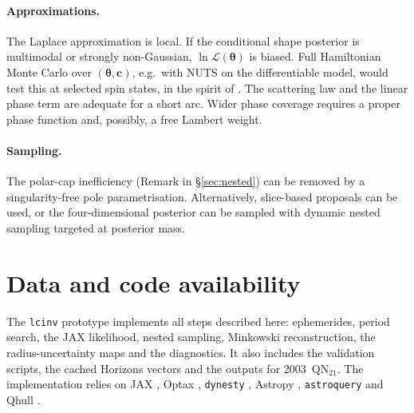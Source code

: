 \documentclass[11pt,a4paper]{article}
\theoremstyle{remark}
\newcommand{\vect}[1]{\bm{#1}}
\begin{document}
\paragraph{Approximations.} The Laplace approximation is local. If the conditional shape posterior is
multimodal or strongly non-Gaussian, $\ln\mathcal L(\vect\theta)$ is biased. Full Hamiltonian Monte
Carlo over $(\vect\theta,\vect c)$, e.g.\ with NUTS \citep{hoffman2014} on the differentiable model,
would test this at selected spin states, in the spirit of \citet{muinonen2020}. The scattering law and
the linear phase term are adequate for a short arc. Wider phase coverage requires a proper phase
function and, possibly, a free Lambert weight.

\paragraph{Sampling.} The polar-cap inefficiency (Remark in \S\ref{sec:nested}) can be removed by a
singularity-free pole parametrisation. Alternatively, slice-based proposals can be used, or the
four-dimensional posterior can be sampled with dynamic nested sampling targeted at posterior mass.

\section*{Data and code availability}
The \texttt{lcinv} prototype implements all steps described here: ephemerides, period search, the JAX
likelihood, nested sampling, Minkowski reconstruction, the radius-uncertainty maps and the diagnostics.
It also includes the validation scripts, the cached Horizons vectors and the outputs for
2003~QN$_{21}$. The implementation relies on JAX \citep{jax2018}, Optax \citep{optax2020},
\texttt{dynesty} \citep{speagle2020}, Astropy \citep{astropy2022}, \texttt{astroquery}
\citep{ginsburg2019} and Qhull \citep{barber1996}.




\appendix
\end{document}
